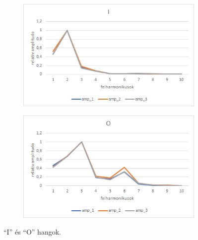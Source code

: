 \documentclass[a4paper,12pt]{article}
\begin{document}
\begin{figure}[h!]
\begin{subfigure}[t]{.5\linewidth}
\centering
\includegraphics[width = \linewidth]{I.png}
\end{subfigure}%
\begin{subfigure}[t]{.5\linewidth}
\centering
\includegraphics[width = \linewidth]{O.png}
\end{subfigure}
\caption{``I'' és ``O'' hangok.}
\label{i_o}
\end{figure}
\end{document}
